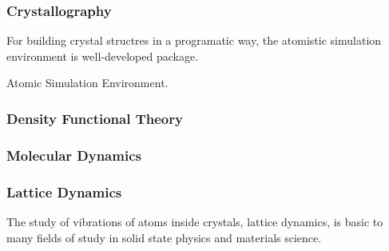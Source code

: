 \documentclass[letterpaper,10pt,english]{sphinxmanual}
\begin{document}
\subsubsection{Crystallography}
\label{\detokenize{computational_simulation_tools:crystallography}}
{\hyperref[\detokenize{crystallography/index:crystal-lattice}]{}}

{\hyperref[\detokenize{crystallography/reciprocal_lattice:reciprocal-lattice}]{}}

For building crystal structres in a programatic way, the atomistic simulation environment is well-developed package.

Atomic Simulation Environment.  


\subsubsection{Density Functional Theory}
\label{\detokenize{computational_simulation_tools:density-functional-theory}}
{\hyperref[\detokenize{dft/dft_intro:dft-intro}]{}}




\subsubsection{Molecular Dynamics}
\label{\detokenize{computational_simulation_tools:molecular-dynamics}}
{\hyperref[\detokenize{md/intro_md:intro-md}]{}}




\subsubsection{Lattice Dynamics}
\label{\detokenize{computational_simulation_tools:lattice-dynamics}}
The study of vibrations of atoms inside crystals, lattice dynamics, is basic to many fields of study in solid state physics and materials science.
\end{document}
